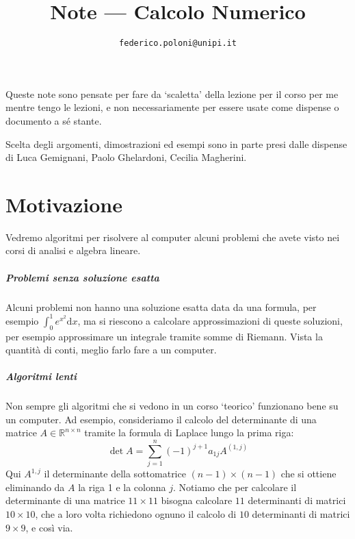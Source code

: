 \documentclass[a4paper]{report}
\title{Note --- Calcolo Numerico}
\author{\texttt{federico.poloni@unipi.it}}
\date{}
\theoremstyle{definiton}
\theoremstyle{remark}
\begin{document}
\maketitle

Queste note sono pensate per fare da `scaletta' della lezione per il corso per me mentre tengo le lezioni, e non necessariamente per essere usate come dispense o documento a sé stante.

Scelta degli argomenti, dimostrazioni ed esempi sono in parte presi dalle dispense di Luca Gemignani, Paolo Ghelardoni, Cecilia Magherini.


\chapter{Motivazione}

Vedremo algoritmi per risolvere al computer alcuni problemi che avete visto nei corsi di analisi e algebra lineare. 

\paragraph{Problemi senza soluzione esatta} Alcuni problemi non hanno una soluzione esatta data da una formula, per esempio $\int_0^1 e^{x^2} \mathrm{d}x$, ma si riescono a calcolare approssimazioni di queste soluzioni, per esempio approssimare un integrale tramite somme di Riemann. Vista la quantità di conti, meglio farlo fare a un computer.

\paragraph{Algoritmi lenti} Non sempre gli algoritmi che si vedono in un corso `teorico' funzionano bene su un computer. Ad esempio, consideriamo il calcolo del determinante di una matrice $A \in \mathbb{R}^{n\times n}$ tramite la formula di Laplace lungo la prima riga:
\[
    \det A = \sum_{j=1}^n (-1)^{j+1} a_{1j} A^{(1,j)}
\]
Qui $A^{1,j}$ il determinante della sottomatrice $(n-1)\times (n-1)$ che si ottiene eliminando da $A$ la riga 1 e la colonna $j$. Notiamo che per calcolare il determinante di una matrice $11\times 11$ bisogna calcolare $11$ determinanti di matrici $10\times 10$, che a loro volta richiedono ognuno il calcolo di $10$ determinanti di matrici $9\times 9$, e così via.
\end{document}

